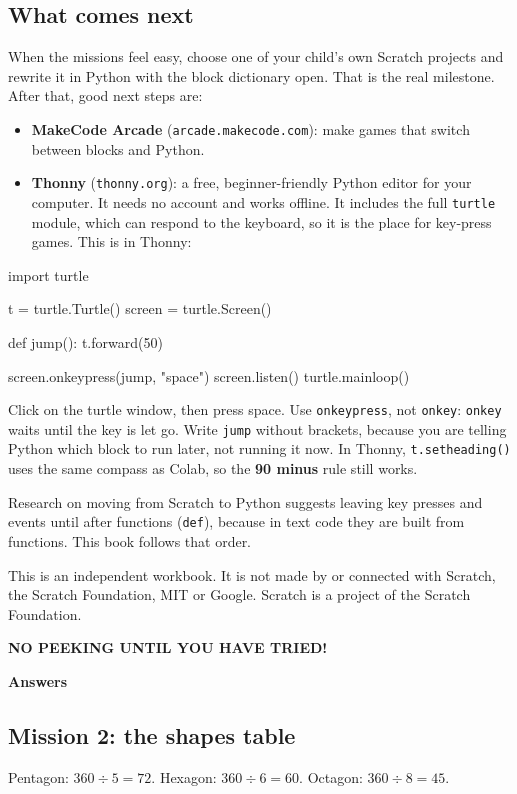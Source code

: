 \documentclass[12pt,a4paper]{article}
\newcommand{\py}{\lstinline[style=inl]}
\newcommand{\banner}[3]{%
  \clearpage
  \begin{tcolorbox}[enhanced, colback=#1, colframe=#1!80!black, arc=10pt, boxrule=0pt,
    left=14pt, top=10pt, bottom=10pt]
    {\small\bfseries\color{ink}#2}\par\vspace{2pt}
    {\fontsize{26}{30}\selectfont\bfseries\color{ink}#3}
  \end{tcolorbox}
  \addcontentsline{toc}{section}{#3}
  \vspace{4pt}}
\begin{document}
\subsection*{What comes next}
When the missions feel easy, choose one of your child's own Scratch projects and rewrite it in Python with the block dictionary open. That is the real milestone. After that, good next steps are:
\begin{itemize}
  \item \textbf{MakeCode Arcade} (\texttt{arcade.makecode.com}): make games that switch between blocks and Python.
  \item \textbf{Thonny} (\texttt{thonny.org}): a free, beginner-friendly Python editor for your computer. It needs no account and works offline. It includes the full \texttt{turtle} module, which can respond to the keyboard, so it is the place for key-press games. This is  in Thonny:
\end{itemize}
\begin{code}
import turtle

t = turtle.Turtle()
screen = turtle.Screen()

def jump():
    t.forward(50)

screen.onkeypress(jump, "space")
screen.listen()
turtle.mainloop()
\end{code}
Click on the turtle window, then press space. Use \py|onkeypress|, not \py|onkey|: \py|onkey| waits until the key is let go. Write \py|jump| without brackets, because you are telling Python which block to run later, not running it now. In Thonny, \py|t.setheading()| uses the same compass as Colab, so the \textbf{90 minus} rule still works.

Research on moving from Scratch to Python suggests leaving key presses and events until after functions (\py|def|), because in text code they are built from functions. This book follows that order.

\vfill
{\small\color{muted}This is an independent workbook. It is not made by or connected with Scratch, the Scratch Foundation, MIT or Google. Scratch is a project of the Scratch Foundation.}

\banner{chalbg}{NO PEEKING UNTIL YOU HAVE TRIED!}{Answers}

\subsection*{Mission 2: the shapes table}
Pentagon: $360 \div 5 = 72$. \quad Hexagon: $360 \div 6 = 60$. \quad Octagon: $360 \div 8 = 45$.
\end{document}
